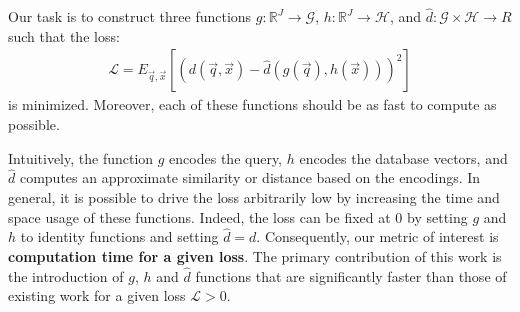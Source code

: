 Our task is to construct three functions $g: \mathbb{R}^J \rightarrow \mathcal{G}$, $h: \mathbb{R}^J \rightarrow \mathcal{H}$, and $\hat{d}: \mathcal{G} \times \mathcal{H} \rightarrow R$ such that the loss:
\begin{align}
    \mathcal{L} = E_{\vec{q},\vec{x}}[(d(\vec{q}, \vec{x}) - \hat{d}(g(\vec{q}), h(\vec{x})))^2]
\end{align}
is minimized. Moreover, each of these functions should be as fast to compute as possible.

Intuitively, the function $g$ encodes the query, $h$ encodes the database vectors, and $\hat{d}$ computes an approximate similarity or distance based on the encodings. In general, it is possible to drive the loss arbitrarily low by increasing the time and space usage of these functions. Indeed, the loss can be fixed at 0 by setting $g$ and $h$ to identity functions and setting $\hat{d} = d$. Consequently, our metric of interest is \textbf{computation time for a given loss}. The primary contribution of this work is the introduction of $g$, $h$ and $\hat{d}$ functions that are significantly faster than those of existing work for a given loss $\mathcal{L} > 0$.





